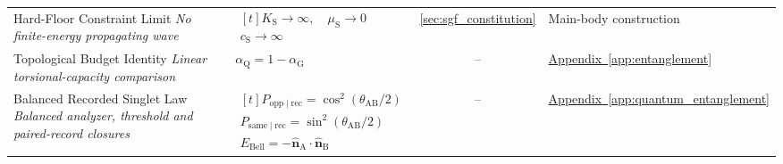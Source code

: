 \begin{longtable}{@{} p{4.5cm} p{6cm} c p{4cm} @{}}
{\raggedright Hard-Floor Constraint Limit \newline \textit{No finite-energy propagating wave}\par} & {\raggedright $\begin{gathered}[t]K_{\mathrm S}\to\infty,\quad\mu_{\mathrm S}\to0 \\ c_{\mathrm S}\to\infty\end{gathered}$\par} & \hyperref[sec:sgf_constitution]{\ref*{sec:sgf_constitution}} & {\raggedright Main-body construction\par} \\

{\raggedright Topological Budget Identity \newline \textit{Linear torsional-capacity comparison}\par} & {\raggedright $\alpha_{\mathrm{Q}} = 1 - \alpha_{\mathrm{G}}$\par} & -- & {\raggedright \hyperref[app:entanglement]{Appendix~\ref*{app:entanglement}}\par} \\

{\raggedright Balanced Recorded Singlet Law \newline \textit{Balanced analyzer, threshold and paired-record closures}\par} & {\raggedright $\begin{gathered}[t]P_{\mathrm{opp}\mid\mathrm{rec}}=\cos^2(\theta_{\mathrm{AB}}/2) \\ P_{\mathrm{same}\mid\mathrm{rec}}=\sin^2(\theta_{\mathrm{AB}}/2) \\ E_{\mathrm{Bell}}=-\widehat{\mathbf n}_{\mathrm A}\!\cdot\widehat{\mathbf n}_{\mathrm B}\end{gathered}$\par} & -- & {\raggedright \hyperref[app:quantum_entanglement]{Appendix~\ref*{app:quantum_entanglement}}\par} \\


\end{longtable}
